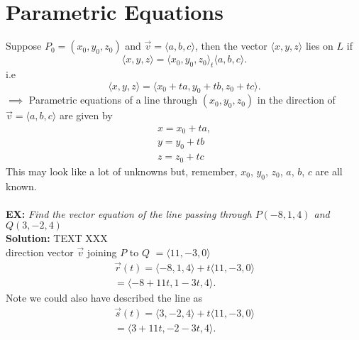 \documentclass{report}
\begin{document}
\section{Parametric Equations}
Suppose $P_0 = \left( x_0,y_0,z_0 \right) $ and $\vec{v} = \langle a,b,c  \rangle $, then the vector $\langle x,y,z  \rangle $ lies on $L$ if
\[
\langle x,y,z  \rangle = \langle x_0,y_0,z_0  \rangle _ t \langle a,b,c  \rangle 
.\] i.e
\[
\langle x,y,z  \rangle = \langle x_0+ta, y_0+tb, z_0+tc  \rangle 
.\] 
$\implies$ Parametric equations of a line through $\left( x_0,y_0,z_0 \right) $ in the direction of $\vec{v} = \langle  a,b,c  \rangle $ are given by 
\begin{align*}
        x=x_0+ta,\\
        y=y_0+tb\\
        z=z_0+tc
\end{align*}
This may look like a lot of unknowns but, remember, $x_0$, $y_0$, $z_0$, $a$, $b$, $c$ are all known.\\
\\
\textbf{EX:} \textit{Find the vector equation of the line passing through $P \left( -8,1,4 \right) $ and $Q \left( 3,-2,4 \right) $}\\
\textbf{Solution:} TEXT XXX \\
direction vector $\vec{v} $ joining $P$ to $Q$ $= \langle 11,-3,0  \rangle $ \\
\begin{align*}
        \vec{r} \left( t \right) = \langle -8,1,4  \rangle + t \langle 11,-3,0  \rangle \\
        = \langle -8 +11t, 1-3t, 4  \rangle 
.\end{align*}
Note we could also have described the line as
 \begin{align*}
        \vec{s} \left( t \right) = \langle 3,-2,4  \rangle + t \langle 11,-3,0  \rangle \\
        = \langle 3+11t, -2-3t,4  \rangle 
.\end{align*}
\end{document}
